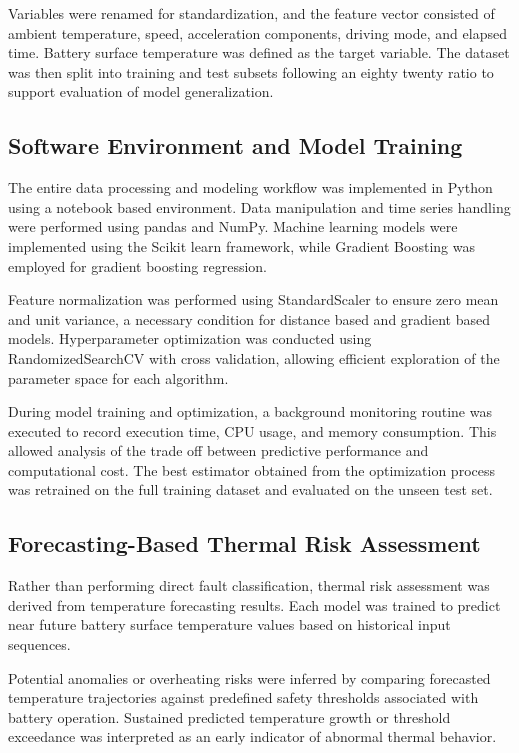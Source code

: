 \documentclass[conference]{IEEEtran}
\begin{document}
Variables were renamed for standardization, and the feature vector consisted of ambient temperature, speed, acceleration components, driving mode, and elapsed time. Battery surface temperature was defined as the target variable. The dataset was then split into training and test subsets following an eighty twenty ratio to support evaluation of model generalization.

\subsection{Software Environment and Model Training}

The entire data processing and modeling workflow was implemented in Python using a notebook based environment. Data manipulation and time series handling were performed using pandas and NumPy. Machine learning models were implemented using the Scikit learn framework, while Gradient Boosting was employed for gradient boosting regression.

Feature normalization was performed using StandardScaler to ensure zero mean and unit variance, a necessary condition for distance based and gradient based models. Hyperparameter optimization was conducted using RandomizedSearchCV with cross validation, allowing efficient exploration of the parameter space for each algorithm.

During model training and optimization, a background monitoring routine was executed to record execution time, CPU usage, and memory consumption. This allowed analysis of the trade off between predictive performance and computational cost. The best estimator obtained from the optimization process was retrained on the full training dataset and evaluated on the unseen test set.

\subsection{Forecasting-Based Thermal Risk Assessment}


Rather than performing direct fault classification, thermal risk assessment was derived from temperature forecasting results. Each model was trained to predict near future battery surface temperature values based on historical input sequences.

Potential anomalies or overheating risks were inferred by comparing forecasted temperature trajectories against predefined safety thresholds associated with battery operation. Sustained predicted temperature growth or threshold exceedance was interpreted as an early indicator of abnormal thermal behavior.
\end{document}
